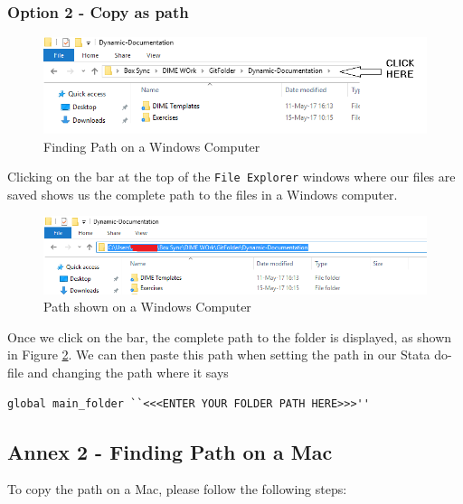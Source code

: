 \documentclass[]{article}
\begin{document}
\subsubsection*{Option 2 - Copy as path}

\begin{figure}[H]
	\centering
	\includegraphics[width=1\linewidth]{img/pathwin}
	\caption{Finding Path on a Windows Computer}
	\label{fig:pathwin}
\end{figure}

Clicking on the bar at the top of the \texttt{File Explorer} windows where our files are saved shows us the complete path to the files in a Windows computer. \\

\begin{figure}[H]
	\centering
	\includegraphics[width=1\linewidth]{img/pathwin2}
	\caption{Path shown on a Windows Computer}
	\label{fig:pathwin2}
\end{figure}

Once we click on the bar, the complete path to the folder is displayed, as shown in Figure \ref{fig:pathwin2}. We can then paste this path when setting the path in our Stata do-file and changing the path where it says \begin{verbatim}
global main_folder ``<<<ENTER YOUR FOLDER PATH HERE>>>''
\end{verbatim} 

\newpage

\subsection*{Annex 2 - Finding Path on a Mac}\label{annex:mac}

To copy the path on a Mac, please follow the following steps: 
\end{document}
